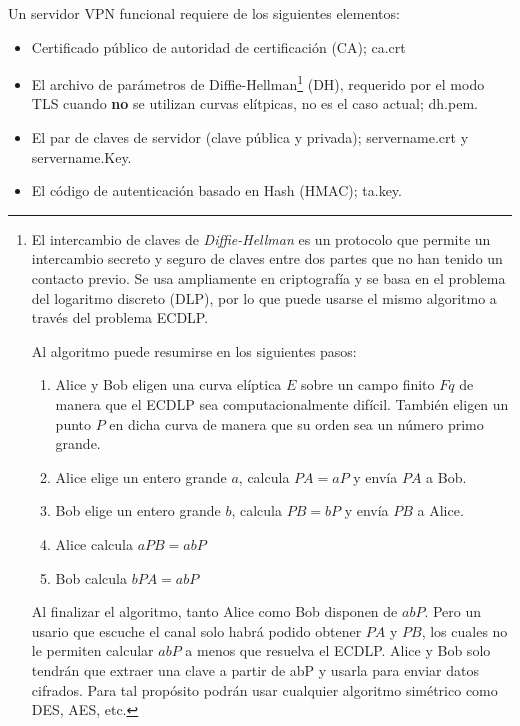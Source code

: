 \documentclass[a4paper, 11pt, titlepage]{article}
\begin{document}
            Un servidor VPN funcional requiere de los siguientes elementos:
        
            \begin{itemize}
                \item Certificado público de autoridad de certificación (CA); ca.crt
                \item El archivo de parámetros de Diffie-Hellman\footnote{
        
                    El intercambio de claves de \textit{Diffie-Hellman} es un protocolo que permite un
                    intercambio secreto y seguro de claves entre dos partes que no han
                    tenido un contacto previo. Se usa ampliamente en criptografía y se basa
                    en el problema del logaritmo discreto (DLP), por lo que puede usarse
                    el mismo algoritmo a través del problema ECDLP.
                    
                    Al algoritmo puede resumirse en los siguientes pasos:
                    
                    \begin{enumerate}
                        \item Alice y Bob eligen una curva elíptica $E$ sobre un campo finito $Fq$ de
                        manera que el ECDLP sea computacionalmente difícil. También eligen un
                        punto $P$ en dicha curva de manera que su orden sea un número primo
                        grande.
                        \item Alice elige un entero grande $a$, calcula $PA=aP$ y envía $PA$ a Bob.
                        \item Bob elige un entero grande $b$, calcula $PB=bP$ y envía $PB$ a Alice.
                        \item Alice calcula $aPB=abP$
                        \item Bob calcula $bPA=abP$
        
                    \end{enumerate}
        
                    Al finalizar el algoritmo, tanto Alice como Bob disponen de $abP$. Pero un
                    usario que escuche el canal solo habrá podido obtener $PA$ y $PB$, los
                    cuales no le permiten calcular $abP$ a menos que resuelva el ECDLP. Alice
                    y Bob solo tendrán que extraer una clave a partir de abP y usarla para
                    enviar datos cifrados. Para tal propósito podrán usar cualquier
                    algoritmo simétrico como DES, AES, etc.
        
                } (DH), requerido por el modo TLS cuando \textbf{no} se utilizan curvas elítpicas, 
                no es el caso actual; dh.pem.
                \item El par de claves de servidor (clave pública y privada); servername.crt y servername.Key.
                \item El código de autenticación basado en Hash (HMAC); ta.key.
            \end{itemize}
        
\end{document}
